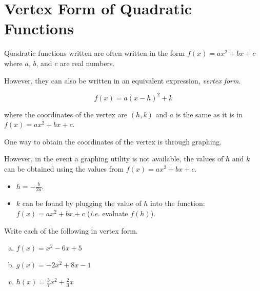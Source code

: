 \chapter{Vertex Form of Quadratic Functions}

Quadratic functions written are often written in the form $f(x) = ax^2 + bx + c $ where $a$, $b$, and $c$ are real numbers. \newline 

However, they can also be written in an equivalent expression, \textit{vertex form}.

\[
f(x) = a(x-h)^2 + k
\]

where the coordinates of the vertex are $(h, k)$ and $a$ is the same as it is in $f(x) = ax^2 + bx + c$. \newline 

One way to obtain the coordinates of the vertex is through graphing. \newline 

However, in the event a graphing utility is not available, the values of $h$ and $k$ can be obtained using the values from $f(x) = ax^2 + bx + c$.

\begin{itemize}
\item $h = -\frac{b}{2a}$.
\item $k$ can be found by plugging the value of $h$ into the function: $f(x) = ax^2 + bx + c$ (\textit{i.e.} evaluate $f(h)$).
\end{itemize}

\begin{example}
Write each of the following in vertex form.
\begin{multicols}{3}
\begin{enumerate}[(a)]
\item $f(x) = x^2 - 6x + 5$
\item $g(x) = -2x^2 + 8x - 1$
\item $h(x) = \frac{3}{7}x^2 + \frac{2}{3}x$
\end{enumerate}
\end{multicols}
\end{example}

